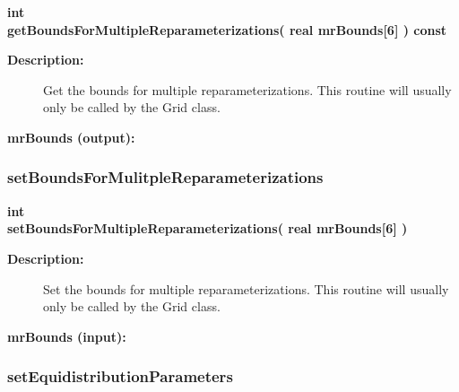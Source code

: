 \begin{flushleft} \textbf{%
int  \\ 
\settowidth{\ReparameterizationTransformIncludeArgIndent}{getBoundsForMultipleReparameterizations(}%
getBoundsForMultipleReparameterizations( real mrBounds[6] ) const
}\end{flushleft}
\begin{description}
\item[{\bf Description:}] 
  Get the bounds for multiple reparameterizations. This routine will usually only be
 called by the Grid class.
\item[{\bf mrBounds (output):}]  
\end{description}
\subsubsection{setBoundsForMulitpleReparameterizations}
 
\begin{flushleft} \textbf{%
int  \\ 
\settowidth{\ReparameterizationTransformIncludeArgIndent}{setBoundsForMultipleReparameterizations(}%
setBoundsForMultipleReparameterizations( real mrBounds[6] )
}\end{flushleft}
\begin{description}
\item[{\bf Description:}] 
  Set the bounds for multiple reparameterizations. This routine will usually only be
 called by the Grid class.
\item[{\bf mrBounds (input):}]  
\end{description}
\subsubsection{setEquidistributionParameters}
 

